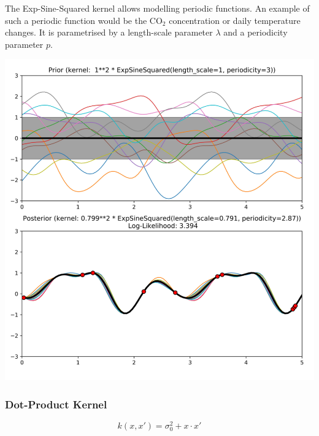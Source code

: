 \documentclass[11pt]{article}
\theoremstyle{definition}
\begin{document}
\noindent
\begin{minipage}{0.55\linewidth}
	The Exp-Sine-Squared kernel allows modelling periodic functions. An example of such a periodic function would be the $\text{CO}_2$ concentration or daily temperature changes. It is parametrised by a length-scale parameter $\lambda$ and a periodicity parameter $p$.
\end{minipage}
\hfill
\begin{minipage}{0.42\linewidth}
	\includegraphics[width=\linewidth]{img/exp_sine_kernel}
\end{minipage}

\subsubsection{Dot-Product Kernel}
\begin{equation*}
	k(x,x') = \sigma_0^2 + x\cdot x'
\end{equation*}
\end{document}
